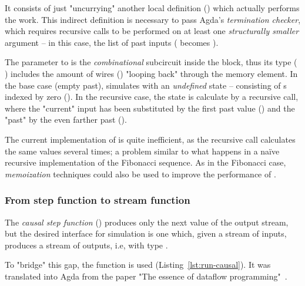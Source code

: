             It consists of just "uncurrying" another local definition () which actually
            performs the work.
            This indirect definition is necessary to pass Agda's \emph{termination checker},
            which requires recursive calls to be performed on at least one \emph{structurally smaller}
            argument – in this case, the list of past inputs (   becomes ).

            The  parameter to  is the \emph{combinational} subcircuit inside the  block,
            thus its type ( \AY{:} \AY{(} \AF{+} \AY{)} \AY{(} \AF{+} \AY{)})
            includes the amount of wires () "looping back" through the memory element.
            In the base case (empty past),  simulates   
            with an \emph{undefined} state – consisting of s indexed by zero ().
            In the recursive case, the state is calculate by a recursive call,
            where the "current" input has been substituted by the first past value () and the "past"
            by the even farther past ().

            The current implementation of  is quite inefficient, as the recursive call calculates
            the same values several times; a problem similar to what happens in a naïve recursive
            implementation of the Fibonacci sequence.
            As in the Fibonacci case, \emph{memoization} techniques could also be used to
            improve the performance of .

            \subsubsection{From step function to stream function}
            \label{subsubsec:step-stream}
            The \emph{causal step function} () produces only the next value of the
            output stream, but the desired interface for simulation is one which, given a stream of
            inputs, produces a stream of outputs, i.e, with type
             \AY{(} \AY{)}   \AY{(} \AY{)}.

            To "bridge" this gap, the  function is used (Listing~\ref{lst:run-causal}).
            It was translated into Agda from the paper
            "The essence of dataflow programming"~\cite{essence-dataflow-programming}.

